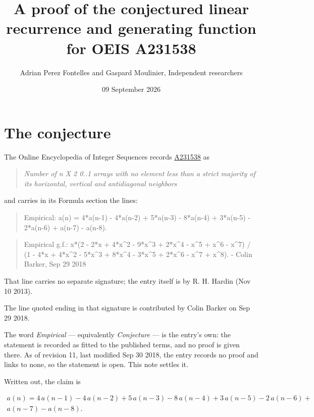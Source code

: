 \documentclass[11pt]{article}
\title{A proof of the conjectured linear recurrence and generating function for OEIS A231538}
\author{Adrian Perez Fontelles and Gaspard Moulinier, Independent researchers}
\date{09 September 2026}
\theoremstyle{definition}
\begin{document}
\maketitle
\section{The conjecture}

The Online Encyclopedia of Integer Sequences records \href{https://oeis.org/A231538}{A231538} as

\begin{quote}\itshape Number of n X 2 0..1 arrays with no element less than a strict majority of its horizontal, vertical and antidiagonal neighbors\end{quote}

and carries in its Formula section the lines:

\begin{quote}\ttfamily Empirical: a(n) = 4*a(n-1) - 4*a(n-2) + 5*a(n-3) - 8*a(n-4) + 3*a(n-5) - 2*a(n-6) + a(n-7) - a(n-8).\end{quote}

\begin{quote}\ttfamily Empirical g.f.: x*(2 - 2*x + 4*x\textasciicircum{}2 - 9*x\textasciicircum{}3 + 2*x\textasciicircum{}4 - x\textasciicircum{}5 + x\textasciicircum{}6 - x\textasciicircum{}7) / (1 - 4*x + 4*x\textasciicircum{}2 - 5*x\textasciicircum{}3 + 8*x\textasciicircum{}4 - 3*x\textasciicircum{}5 + 2*x\textasciicircum{}6 - x\textasciicircum{}7 + x\textasciicircum{}8). - Colin Barker, Sep 29 2018\end{quote}

That line carries no separate signature; the entry itself is by R. H. Hardin (Nov 10 2013).

The line quoted ending in that signature is contributed by Colin Barker on Sep 29 2018.

The word {\itshape Empirical} --- equivalently {\itshape Conjecture} --- is the entry's own: the statement is recorded as fitted to the published terms, and no proof is given there. As of revision 11, last modified Sep 30 2018, the entry records no proof and links to none, so the statement is open. This note settles it.

Written out, the claim is

\begin{multline*} a(n) = 4\,a(n-1) - 4\,a(n-2) + 5\,a(n-3) - 8\,a(n-4) + 3\,a(n-5) - 2\,a(n-6) + \\ a(n-7) - a(n-8). \end{multline*}
\end{document}
